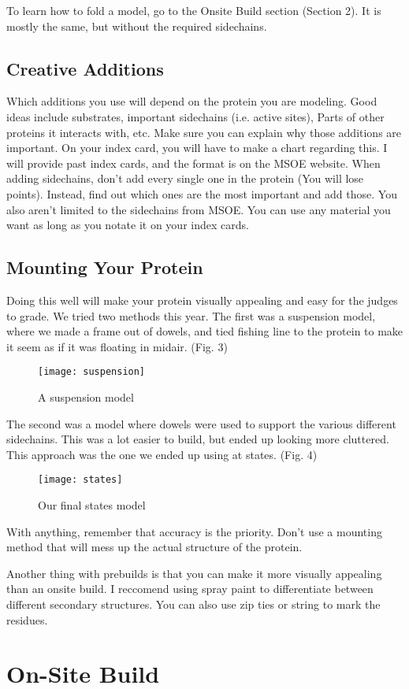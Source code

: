 \documentclass[twocolumn]{article}
\begin{document}
To learn how to fold a model, go to the Onsite Build section (Section 2). It is mostly the same, but without the required sidechains. 
\subsection{Creative Additions}
Which additions you use will depend on the protein you are modeling. Good ideas include substrates, important sidechains (i.e. active sites), Parts of other proteins it interacts with, etc. Make sure you can explain why those additions are important. On your index card, you will have to make a chart regarding this. I will provide past index cards, and the format is on the MSOE website. When adding sidechains, don't add every single one in the protein (You will lose points). Instead, find out which ones are the most important and add those. You also aren't limited to the sidechains from MSOE. You can use any material you want as long as you notate it on your index cards. 
\subsection{Mounting Your Protein}
Doing this well will make your protein visually appealing and easy for the judges to grade. We tried two methods this year. The first was a suspension model, where we made a frame out of dowels, and tied fishing line to the protein to make it seem as if it was floating in midair. (Fig. 3)
\begin{figure}[h!]
\caption{A suspension model}
\centering
\texttt{[image: suspension]}
\end{figure}
The second was a model where dowels were used to support the various different sidechains. This was a lot easier to build, but ended up looking more cluttered. This approach was the one we ended up using at states. (Fig. 4)
\begin{figure}[h!]
\caption{Our final states model}
\centering
\texttt{[image: states]}
\end{figure}

With anything, remember that accuracy is the priority. Don't use a mounting method that will mess up the actual structure of the protein. 

Another thing with prebuilds is that you can make it more visually appealing than an onsite build. I reccomend using spray paint to differentiate between different secondary structures. You can also use zip ties or string to mark the residues. 
\section{On-Site Build}
\end{document}
